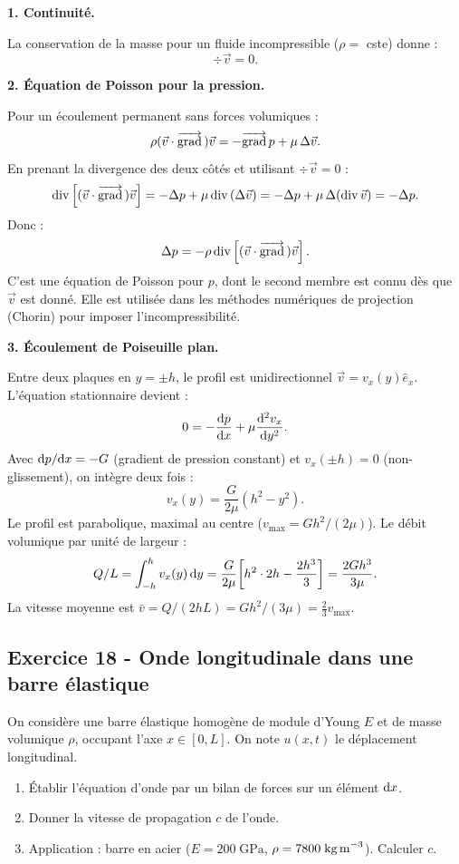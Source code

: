 \documentclass[12pt,a4paper]{article}
\begin{document}
\begin{boitecorrige}

\textbf{1. Continuité.}

La conservation de la masse pour un fluide incompressible ($\rho = $ cste) donne :
\[
\div\vec{v} = 0.
\]

\textbf{2. Équation de Poisson pour la pression.}

Pour un écoulement permanent sans forces volumiques :
\[
\rho(\vec{v}\cdot\overrightarrow{\mathrm{grad}}\,)\vec{v} = -\overrightarrow{\mathrm{grad}}\, p + \mu\,\Delta\vec{v}.
\]
En prenant la divergence des deux côtés et utilisant $\div\vec{v} = 0$ :
\[
\mathrm{div}\,\!\left[(\vec{v}\cdot\overrightarrow{\mathrm{grad}}\,)\vec{v}\right] = -\Delta p + \mu\,\mathrm{div}\,(\Delta\vec{v}) = -\Delta p + \mu\,\Delta(\mathrm{div}\,\vec{v}) = -\Delta p.
\]
Donc :
\[
\Delta p = -\rho\,\mathrm{div}\,\!\left[(\vec{v}\cdot\overrightarrow{\mathrm{grad}}\,)\vec{v}\right].
\]
C'est une équation de Poisson pour $p$, dont le second membre est connu dès que $\vec{v}$ est donné. Elle est utilisée dans les méthodes numériques de projection (Chorin) pour imposer l'incompressibilité.

\textbf{3. Écoulement de Poiseuille plan.}

Entre deux plaques en $y=\pm h$, le profil est unidirectionnel $\vec{v} = v_x(y)\hat{e}_x$. L'équation stationnaire devient :
\[
0 = -\frac{\mathrm{d} p}{\mathrm{d} x} + \mu\frac{\mathrm{d}^2 v_x}{\mathrm{d} y^2}.
\]
Avec $\mathrm{d} p/\mathrm{d} x = -G$ (gradient de pression constant) et $v_x(\pm h) = 0$ (non-glissement), on intègre deux fois :
\[
v_x(y) = \frac{G}{2\mu}(h^2 - y^2).
\]
Le profil est parabolique, maximal au centre ($v_\text{max} = Gh^2/(2\mu)$). Le débit volumique par unité de largeur :
\[
Q/L = \int_{-h}^{h} v_x(y)\,\mathrm{d} y = \frac{G}{2\mu}\!\left[h^2\cdot 2h - \frac{2h^3}{3}\right] = \frac{2Gh^3}{3\mu}.
\]
La vitesse moyenne est $\bar{v} = Q/(2hL) = Gh^2/(3\mu) = \tfrac{2}{3}v_\text{max}$.

\end{boitecorrige}

\subsection*{Exercice 18 - Onde longitudinale dans une barre élastique \niveau{\moyen}}

\begin{boiteexercice}
On considère une barre élastique homogène de module d'Young $E$ et de masse volumique $\rho$, occupant l'axe $x\in[0,L]$. On note $u(x,t)$ le déplacement longitudinal.
\begin{enumerate}
  \item Établir l'équation d'onde par un bilan de forces sur un élément $\mathrm{d} x$.
  \item Donner la vitesse de propagation $c$ de l'onde.
  \item Application : barre en acier ($E = 200\;\text{GPa}$, $\rho = 7800\;\text{kg\,m}^{-3}$). Calculer $c$.
\end{enumerate}
\end{boiteexercice}
\end{document}
